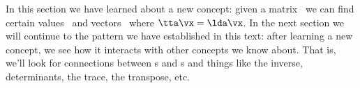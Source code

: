 \medskip

In this section we have learned about a new concept: given a matrix \tta\ we can find certain values \lda\ and vectors \vx\ where $\tta\vx =\lda\vx$. In the next section we will continue to the pattern we have established in this text: after learning a new concept, we see how it interacts with other concepts we know about. That is, we'll look for connections between \el s and \ev s and things like the inverse, determinants, the trace, the transpose, etc.

